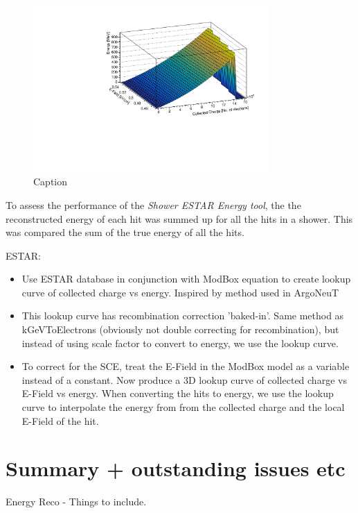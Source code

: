 \begin{figure}[hb]
    \centering
    \includegraphics[width = 0.8\textwidth]{figures-chap4/ESTAR_lookup_curve.pdf}
    \caption{Caption}
    \label{fig:ESTAR lookup curve}
\end{figure}

To assess the performance of the \textit{Shower ESTAR Energy tool}, the the reconstructed energy of each hit was summed up for all the hits in a shower. This was compared the sum of the true energy of all the hits.

ESTAR: 
\begin{itemize}
    \item Use ESTAR database in conjunction with ModBox equation to create lookup curve of collected charge vs energy. Inspired by method used in ArgoNeuT 
    \item This lookup curve has recombination correction 'baked-in'. Same method as kGeVToElectrons (obviously not double correcting for recombination), but instead of using scale factor to convert to energy, we use the lookup curve.
    \item To correct for the SCE, treat the E-Field in the ModBox model as a variable instead of a constant. Now produce a 3D lookup curve of collected charge vs E-Field vs energy. When converting the hits to energy, we use the lookup curve to interpolate the energy from from the collected charge and the local E-Field of the hit.  
\end{itemize}

\section{Summary + outstanding issues etc}

Energy Reco - Things to include.

